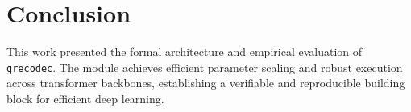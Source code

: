 \section{Conclusion}
This work presented the formal architecture and empirical evaluation of \texttt{grecodec}. The module achieves efficient parameter scaling and robust execution across transformer backbones, establishing a verifiable and reproducible building block for efficient deep learning.
